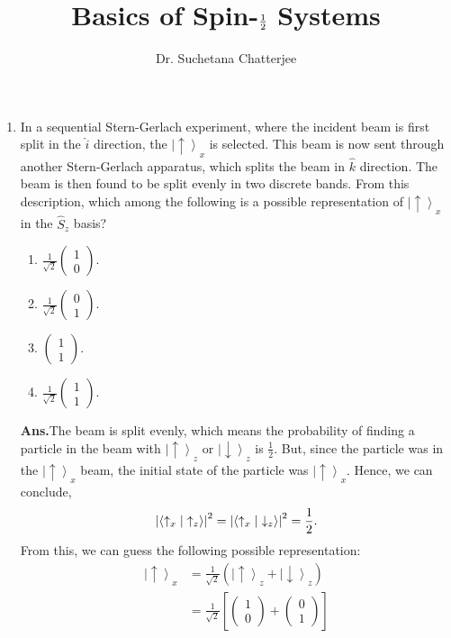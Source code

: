 \documentclass[12pt]{article}
\title{Basics of Spin-$\half$ Systems}
\author{Dr. Suchetana Chatterjee}
\newcommand\half{\frac{1}{2}}
\newcommand\lr{\left \langle}
\newcommand\rr{\right \rangle}
\newcommand\ls{\left |}
\newcommand\rs{\right |}
\newcommand\hs{\hat{S}}
\newcommand\tbf[1]{\textbf{#1}}
\newcommand\ua{\uparrow}
\newcommand\da{\downarrow}
\newcommand\rhalf{\frac{1}{\sqrt{2}}}
\newcommand\tans{\tbf{Ans.}}
\newcommand\usp{\ls \ua \rr}
\newcommand\dsp{\ls \da \rr}
\begin{document}
\maketitle
\begin{enumerate}[\bf 1.]



\item In a sequential Stern-Gerlach experiment, where the incident beam is first split in the $\hat{i}$ direction, the $\usp _x$ is selected. This beam is now sent through another Stern-Gerlach apparatus, which splits the beam in $\hat{k}$ direction. The beam is then found to be split evenly in two discrete bands. From this description, which among the following is a possible representation of $\usp _x$ in the $\hs _z$ basis?
\begin{enumerate}[\bf I.]
\item $\rhalf \left(\begin{array}{c} 1 \\ 0 \end{array}\right)$.
\item $\rhalf \left(\begin{array}{c} 0 \\ 1 \end{array}\right)$.
\item $\left(\begin{array}{c} 1 \\ 1 \end{array}\right)$.
\item $\rhalf \left(\begin{array}{c} 1 \\ 1 \end{array}\right)$.
\end{enumerate}
\vskip 1cm
\tans The beam is split evenly, which means the probability of finding a particle in the beam with $\usp _z$ or $\dsp _z$ is $\half$. But, since the particle was in the $\usp _x$ beam, the initial state of the particle was $\usp _x$. Hence, we can conclude,
$$
\ls \lr \ua _x \vphantom{.}\rs \left. \ua _z \rr \rs^2 = \ls \lr \ua _x \vphantom{.}\rs \left. \da _z \rr \rs^2 = \half.
$$
From this, we can guess the following possible representation:
$$
\begin{aligned}
\usp _x &= \rhalf \left(\usp _z + \dsp _z \right) \\
	&= \rhalf \left[\left(\begin{array}{c} 1 \\ 0 \end{array}\right)+\left(\begin{array}{c} 0 \\ 1 \end{array}\right)\right] \\

\end{aligned}$$
\end{enumerate}
\end{document}

